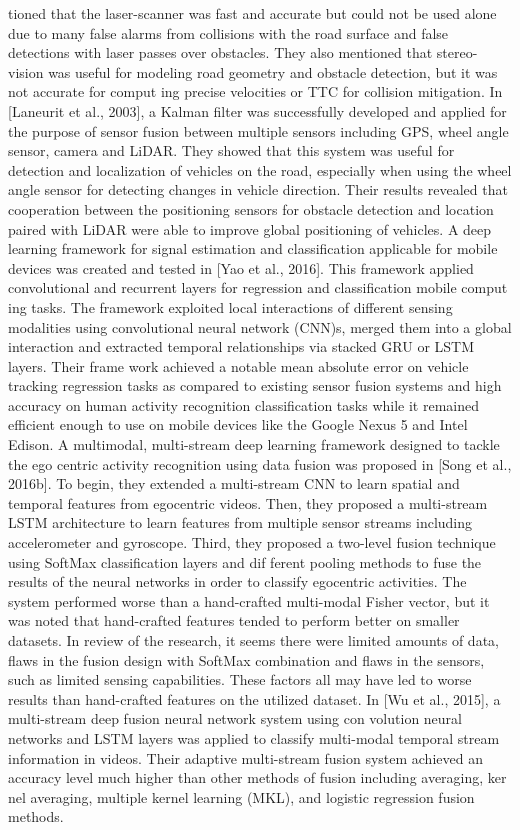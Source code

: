 tioned that the laser-scanner was fast and accurate but could not be used alone due
to many false alarms from collisions with the road surface and false detections with
laser passes over obstacles. They also mentioned that stereo-vision was useful for
modeling road geometry and obstacle detection, but it was not accurate for comput
ing precise velocities or TTC for collision mitigation.
In [Laneurit et al., 2003], a Kalman ﬁlter was successfully developed and applied
for the purpose of sensor fusion between multiple sensors including GPS, wheel angle
sensor, camera and LiDAR. They showed that this system was useful for detection
and localization of vehicles on the road, especially when using the wheel angle sensor
for detecting changes in vehicle direction. Their results revealed that cooperation between the positioning sensors for obstacle detection and location paired with LiDAR
were able to improve global positioning of vehicles.
A deep learning framework for signal estimation and classiﬁcation applicable for
mobile devices was created and tested in [Yao et al., 2016]. This framework applied
convolutional and recurrent layers for regression and classiﬁcation mobile comput
ing tasks. The framework exploited local interactions of diﬀerent sensing modalities
using convolutional neural network (CNN)s, merged them into a global interaction
and extracted temporal relationships via stacked GRU or LSTM layers. Their frame
work achieved a notable mean absolute error on vehicle tracking regression tasks as
compared to existing sensor fusion systems and high accuracy on human activity
recognition classiﬁcation tasks while it remained eﬃcient enough to use on mobile
devices like the Google Nexus 5 and Intel Edison.
A multimodal, multi-stream deep learning framework designed to tackle the ego
centric activity recognition using data fusion was proposed in [Song et al., 2016b]. To
begin, they extended a multi-stream CNN to learn spatial and temporal features from
egocentric videos. Then, they proposed a multi-stream LSTM architecture to learn
features from multiple sensor streams including accelerometer and gyroscope. Third,
they proposed a two-level fusion technique using SoftMax classiﬁcation layers and dif
ferent pooling methods to fuse the results of the neural networks in order to classify
egocentric activities. The system performed worse than a hand-crafted multi-modal
Fisher vector, but it was noted that hand-crafted features tended to perform better
on smaller datasets. In review of the research, it seems there were limited amounts of
data, ﬂaws in the fusion design with SoftMax combination and ﬂaws in the sensors,
such as limited sensing capabilities. These factors all may have led to worse results
than hand-crafted features on the utilized dataset.
In [Wu et al., 2015], a multi-stream deep fusion neural network system using con
volution neural networks and LSTM layers was applied to classify multi-modal temporal stream information in videos. Their adaptive multi-stream fusion system achieved
an accuracy level much higher than other methods of fusion including averaging, ker
nel averaging, multiple kernel learning (MKL), and logistic regression fusion methods.



